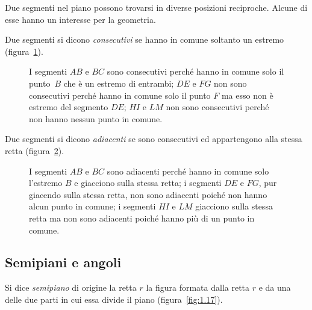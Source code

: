 Due segmenti nel piano possono trovarsi in diverse posizioni 
reciproche. Alcune di esse hanno un interesse per la geometria.
\begin{definizione}
Due segmenti si dicono \emph{consecutivi} se hanno in comune soltanto 
un estremo (figura~\ref{fig:1.14}).
\end{definizione}

\begin{inaccessibleblock}
 \begin{figure}[bth]
 \centering 
 \caption{I segmenti $AB$ e $BC$ sono consecutivi perché hanno in 
comune solo il punto~$B$ che è un estremo di entrambi; $DE$ e $FG$ 
non sono consecutivi perché hanno in comune solo il punto $F$ ma esso 
non è estremo del segmento $DE$; $HI$ e $LM$ non sono consecutivi 
perché non hanno nessun punto in comune.}\label{fig:1.14}
\end{figure}
\end{inaccessibleblock}

\begin{definizione}
Due segmenti si dicono \emph{adiacenti} se sono consecutivi ed 
appartengono alla stessa retta (figura~\ref{fig:1.15}).
\end{definizione}

\begin{inaccessibleblock}
 \begin{figure}[tbh]
 \centering 
 \caption{I segmenti $AB$ e $BC$ sono adiacenti perché hanno in 
comune solo l'estremo $B$ e giacciono sulla stessa retta; i segmenti 
$DE$ e $FG$, pur giacendo sulla stessa retta, non sono adiacenti 
poiché non hanno alcun punto in comune; i segmenti $HI$ e $LM$ 
giacciono sulla stessa retta ma non sono adiacenti poiché hanno più 
di un punto in comune.}\label{fig:1.15}
\end{figure}
\end{inaccessibleblock}

\ovalbox{\risolvii \ref{ese:1.43}, \ref{ese:1.44}, \ref{ese:1.45}, 
\ref{ese:1.46}, \ref{ese:1.47}, \ref{ese:1.48}, \ref{ese:1.49}, 
\ref{ese:1.50}}

\subsection{Semipiani e angoli}

\begin{definizione}
Si dice \emph{semipiano} di origine la retta $r$ la figura formata 
dalla retta $r$ e da una delle due parti in cui essa divide il piano 
(figura~\ref{fig:1.17}).
\end{definizione}

